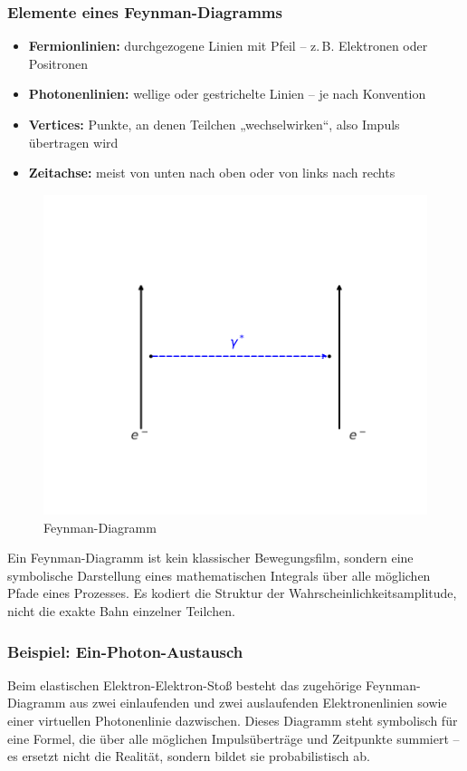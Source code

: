 \subsubsection*{Elemente eines Feynman-Diagramms}
\begin{itemize}
	\item \textbf{Fermionlinien:} durchgezogene Linien mit Pfeil – z.\,B. Elektronen oder Positronen
	\item \textbf{Photonenlinien:} wellige oder gestrichelte Linien – je nach Konvention
	\item \textbf{Vertices:} Punkte, an denen Teilchen „wechselwirken“, also Impuls übertragen wird
	\item \textbf{Zeitachse:} meist von unten nach oben oder von links nach rechts
\end{itemize}
\begin{figure}[H]
	\begin{center}
		\includegraphics[width=0.45\linewidth]{bilder/feynman-einphoton.pdf}
	\end{center}
	\caption{Feynman-Diagramm}
\end{figure}

\vspace{0.5em}
\begin{tcolorbox}[physikbox, title=Was ein Feynman-Diagramm wirklich zeigt]
	\label{box:Was ein Feynman-Diagramm}
	Ein Feynman-Diagramm ist kein klassischer Bewegungsfilm, sondern eine symbolische Darstellung eines mathematischen Integrals über alle möglichen Pfade eines Prozesses. Es kodiert die Struktur der Wahrscheinlichkeitsamplitude, nicht die exakte Bahn einzelner Teilchen.
\end{tcolorbox}

\subsubsection*{Beispiel: Ein-Photon-Austausch}
Beim elastischen Elektron-Elektron-Stoß besteht das zugehörige Feyn\-man-Diagramm aus zwei einlaufenden und zwei auslaufenden Elektronenlinien sowie einer virtuellen Photonenlinie dazwischen. Dieses Diagramm steht symbolisch für eine Formel, die über alle möglichen Impulsüberträge und Zeitpunkte summiert – es ersetzt nicht die Realität, sondern bildet sie probabilistisch ab.

